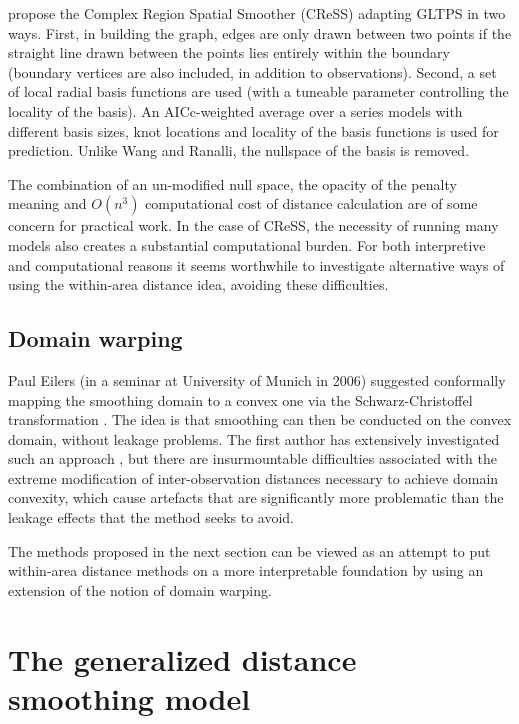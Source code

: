 \documentclass[smallextended]{svjour3}       %
\begin{document}
\cite{ScottHayward:2011tc} propose the Complex Region Spatial Smoother (CReSS) adapting GLTPS in two ways. First, in building the graph, edges are only drawn between two points if the straight line drawn between the points lies entirely within the boundary (boundary vertices are also included, in addition to observations). Second, a set of local radial basis functions are used (with a tuneable parameter controlling the locality of the basis). An AICc-weighted average over a series models with different basis sizes, knot locations and locality of the basis functions is used for prediction. Unlike Wang and Ranalli, the nullspace of the basis is removed.

The combination of an un-modified null space, the opacity of the penalty meaning and $O(n^3)$ computational cost of distance calculation are of some concern for practical work. In the case of CReSS, the necessity of running many models also creates a substantial computational burden. For both interpretive and computational reasons it seems worthwhile to investigate alternative ways of using the within-area distance idea, avoiding these difficulties.

\subsection{Domain warping}

Paul Eilers (in a seminar at University of Munich in 2006) suggested conformally mapping the smoothing domain to a convex one  via the Schwarz-Christoffel transformation \citep{Driscoll:2002tq}. The idea is that smoothing can then be conducted on the convex domain, without leakage problems. The first author has extensively investigated such an approach \citep[Chapter 3]{Miller:2012wy}, but there are insurmountable difficulties associated with the extreme modification of inter-observation distances necessary to achieve domain convexity, which cause artefacts that are significantly more problematic than the leakage effects that the method seeks to avoid. 

The methods proposed in the next section can be viewed as an attempt to put within-area distance methods on a more interpretable foundation by using an extension of the notion of domain warping. 


\section{The generalized distance smoothing model}
\label{proposed-model}
\end{document}
